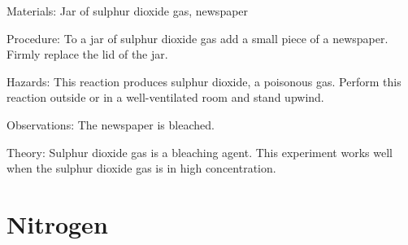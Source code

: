 \begin{multicols}{2}
\begin{description*}
\item[Materials:]{Jar of sulphur dioxide gas, newspaper}
\item[Procedure:]{To a jar of sulphur dioxide gas add a small
piece of a newspaper. Firmly replace the lid of
the jar.}
\item[Hazards:]{This reaction produces sulphur dioxide, a poisonous gas. Perform this
reaction outside or in a well-ventilated room and stand upwind.}
\item[Observations:]{The newspaper is bleached.}
\item[Theory:]{Sulphur dioxide gas is a bleaching agent.
This experiment works well when the sulphur
dioxide gas is in high concentration.}
\end{description*}

\columnbreak

%
%


\section*{Nitrogen} 



\end{multicols}
